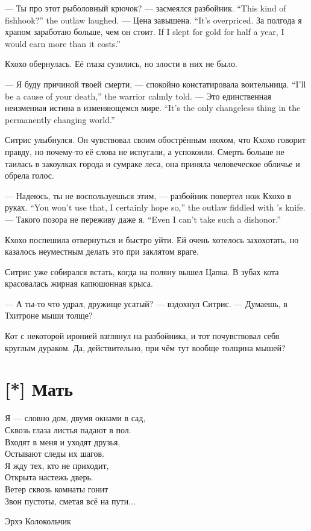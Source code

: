 {--- Ты про этот рыболовный крючок? --- засмеялся разбойник.}
{``This kind of fishhook?'' the outlaw laughed.}
{--- Цена завышена.}
{``It's overpriced.}
{За полгода я храпом заработаю больше, чем он стоит.}
{If I slept for gold for half a year, I would earn more than it costs.''}

Кхохо обернулась.
Её глаза сузились, но злости в них не было.

{--- Я буду причиной твоей смерти, --- спокойно констатировала воительница.}
{``I'll be a cause of your death,'' the warrior calmly told.}
{--- Это единственная неизменная истина в изменяющемся мире.}
{``It's the only changeless thing in the permanently changing world.''}

Ситрис улыбнулся.
Он чувствовал своим обострённым нюхом, что Кхохо говорит правду, но почему-то её слова не испугали, а успокоили.
Смерть больше не таилась в закоулках города и сумраке леса, она приняла человеческое обличье и обрела голос.

{--- Надеюсь, ты не воспользуешься этим, --- разбойник повертел нож Кхохо в руках.}
{``You won't use that, I certainly hope so,'' the outlaw fiddled with \Kchoho's knife.}
{--- Такого позора не переживу даже я.}
{``Even I can't take such a dishonor.''}

Кхохо поспешила отвернуться и быстро уйти.
Ей очень хотелось захохотать, но казалось неуместным делать это при заклятом враге.

Ситрис уже собирался встать, когда на поляну вышел Цапка.
В зубах кота красовалась жирная капюшонная крыса.

--- А ты-то что удрал, дружище усатый? --- вздохнул Ситрис.
--- Думаешь, в Тхитроне мыши толще?

Кот с некоторой иронией взглянул на разбойника, и тот почувствовал себя круглым дураком.
Да, действительно, при чём тут вообще толщина мышей?

\section{[*] Мать}

\epigraph
{Я --- словно дом, двумя окнами в сад,\\
Сквозь глаза листья падают в пол.\\
Входят в меня и уходят друзья,\\
Остывают следы их шагов.\\
Я жду тех, кто не приходит,\\
Открыта настежь дверь.\\
Ветер сквозь комнаты гонит\\
Звон пустоты, сметая всё на пути...}
{Эрхэ Колокольчик}

